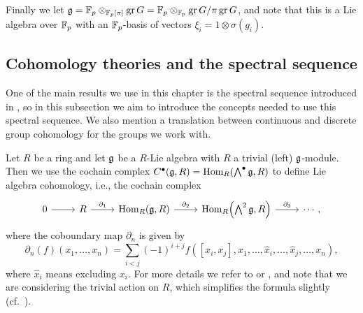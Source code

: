 Finally we let $\mathfrak{g} = \mathbb{F}_{p} \otimes_{\mathbb{F}_{p}[\pi]} \operatorname{gr} G = \mathbb{F}_{p} \otimes_{\mathbb{F}_{p}} \operatorname{gr} G/\pi\operatorname{gr} G$, and note that this is a Lie algebra over $\mathbb{F}_{p}$ with an $\mathbb{F}_{p}$-basis of vectors $\xi_{i} = 1 \otimes \sigma(g_{i})$. %

\subsection{Cohomology theories and the spectral sequence}%
\label{subsec:coh-and-spec-seq}

One of the main results we use in this chapter is the spectral sequence introduced in \cite[§6.1]{Sor}, so in this subsection we aim to introduce the concepts needed to use this spectral sequence. We also mention a translation between continuous and discrete group cohomology for the groups we work with.

Let $R$ be a ring and let $\mathfrak{g}$ be a $R$-Lie algebra with $R$ a trivial (left) $\mathfrak{g}$-module. Then we use the cochain complex $C^\bullet(\mathfrak{g},R) = \operatorname{Hom}_{R}(\bigwedge^{\bullet}\mathfrak{g}, R)$ to define Lie algebra cohomology, i.e., the cochain complex
\[
  \begin{tikzcd}
    0 \ar[r] & R \ar[r,"\partial_{1}"] & \Hom_{R}(\lie{g},R) \ar[r,"\partial_{2}"] & \Hom_{R}\Bigl(\bigwedge^2\lie{g}, R\Bigr) \ar[r,"\partial_{3}"] &  \cdots,
  \end{tikzcd}
\]
where the coboundary map $\partial_{n}$ is given by
\begin{equation*}
  \partial_{n}(f)(x_1,\dotsc,x_{n}) = \sum_{i<j}(-1)^{i+j}f([x_i,x_j],x_1,\dotsc,\widehat{x}_i,\dotsc,\widehat{x}_j,\dotsc,x_{n}),
\end{equation*}
where $\widehat{x}_{i}$ means excluding $x_{i}$. For more details we refer to \cite[Thm.~7.1]{CartanHomAlg} or \cite[Chap.~1~§3]{Fuks}, and note that we are considering the trivial action on $R$, which simplifies the formula slightly (cf.\ \cite[Chap.~1~§3.2]{Fuks}).

